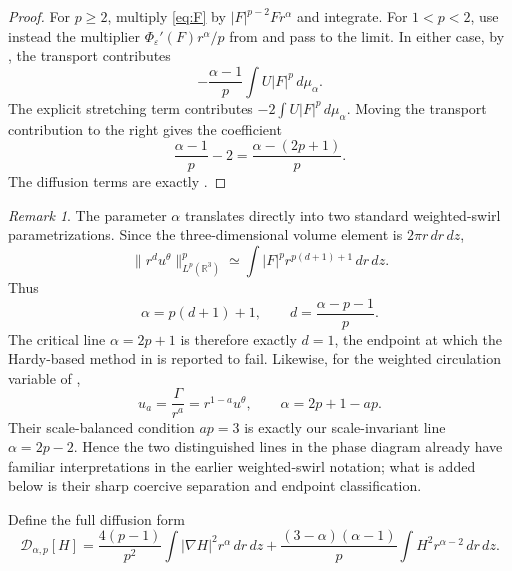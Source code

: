\documentclass[11pt]{article}
\numberwithin{equation}{section}
\theoremstyle{remark}
\newtheorem{remark}[theorem]{Remark}
\begin{document}
\begin{proof}
For \(p\ge2\), multiply \eqref{eq:F} by \(|F|^{p-2}F r^\alpha\) and integrate.  For \(1<p<2\), use instead the multiplier \(\Phi_\varepsilon'(F)r^\alpha/p\) from  and pass to the limit.  In either case, by , the transport contributes
\[
 -\frac{\alpha-1}{p}\int U|F|^p\,d\mu_\alpha.
\]
The explicit stretching term contributes \(-2\int U|F|^p\,d\mu_\alpha\).  Moving the transport contribution to the right gives the coefficient
\[
 \frac{\alpha-1}{p}-2=\frac{\alpha-(2p+1)}p.
\]
The diffusion terms are exactly .
\end{proof}

\begin{remark}\label{rem:parameter-dictionary}
The parameter \(\alpha\) translates directly into two standard weighted-swirl parametrizations.  Since the three-dimensional volume element is \(2\pi r\,dr\,dz\),
\[
 \|r^d u^\theta\|_{L^p(\mathbb R^3)}^p
 \simeq \int |F|^p r^{p(d+1)+1}\,dr\,dz.
\]
Thus
\begin{equation}\label{eq:d-dictionary}
 \alpha=p(d+1)+1,
 \qquad
 d=\frac{\alpha-p-1}{p}.
\end{equation}
The critical line \(\alpha=2p+1\) is therefore exactly \(d=1\), the endpoint at which the Hardy-based method in \cite{ChenFangZhang2017} is reported to fail.  Likewise, for the weighted circulation variable of \cite{RencZaj2019},
\[
 u_a=\frac{\Gamma}{r^a}=r^{1-a}u^\theta,
 \qquad
 \alpha=2p+1-ap.
\]
Their scale-balanced condition \(ap=3\) is exactly our scale-invariant line \(\alpha=2p-2\).  Hence the two distinguished lines in the phase diagram already have familiar interpretations in the earlier weighted-swirl notation; what is added below is their sharp coercive separation and endpoint classification.
\end{remark}

Define the full diffusion form
\[
 \mathcal D_{\alpha,p}[H]
 =\frac{4(p-1)}{p^2}\int |\nabla H|^2r^\alpha\,dr\,dz
 +\frac{(3-\alpha)(\alpha-1)}p
 \int H^2r^{\alpha-2}\,dr\,dz.
\]
\end{document}
